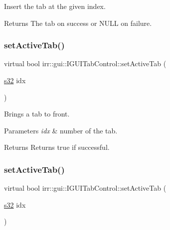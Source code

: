 Insert the tab at the given index. 

\begin{DoxyReturn}{Returns}
The tab on success or N\+U\+LL on failure. 
\end{DoxyReturn}
\mbox{\label{classirr_1_1gui_1_1IGUITabControl_a2a2d810ff8a79c4226831b689a4d8b3a}} 
\subsubsection{\texorpdfstring{set\+Active\+Tab()}{setActiveTab()}\hspace{0.1cm}{\footnotesize\ttfamily [1/4]}}
{\footnotesize\ttfamily virtual bool irr\+::gui\+::\+I\+G\+U\+I\+Tab\+Control\+::set\+Active\+Tab (\begin{DoxyParamCaption}\item[{\hyperlink{namespaceirr_ac66849b7a6ed16e30ebede579f9b47c6}{s32}}]{idx }\end{DoxyParamCaption})\hspace{0.3cm}{\ttfamily [pure virtual]}}



Brings a tab to front. 


\begin{DoxyParams}{Parameters}
{\em idx} & number of the tab. \\
\hline
\end{DoxyParams}
\begin{DoxyReturn}{Returns}
Returns true if successful. 
\end{DoxyReturn}
\mbox{\label{classirr_1_1gui_1_1IGUITabControl_a2a2d810ff8a79c4226831b689a4d8b3a}} 
\subsubsection{\texorpdfstring{set\+Active\+Tab()}{setActiveTab()}\hspace{0.1cm}{\footnotesize\ttfamily [2/4]}}
{\footnotesize\ttfamily virtual bool irr\+::gui\+::\+I\+G\+U\+I\+Tab\+Control\+::set\+Active\+Tab (\begin{DoxyParamCaption}\item[{\hyperlink{namespaceirr_ac66849b7a6ed16e30ebede579f9b47c6}{s32}}]{idx }\end{DoxyParamCaption})\hspace{0.3cm}{\ttfamily [pure virtual]}}



